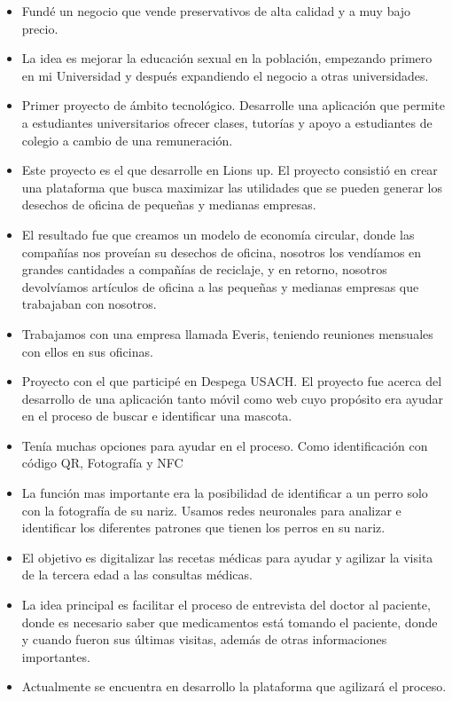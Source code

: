 \begin{itemize}
\item Fundé un negocio que vende preservativos de alta calidad y a muy bajo precio.
\item La idea es mejorar la educación sexual en la población, empezando primero en mi Universidad y después expandiendo el negocio a otras universidades.
\end{itemize}
\smallskip
{}
\begin{itemize}
\item Primer proyecto de ámbito tecnológico. Desarrolle una aplicación que permite a estudiantes universitarios ofrecer clases, tutorías y apoyo a estudiantes de colegio a cambio de una remuneración.
\end{itemize}
\smallskip
{}
\begin{itemize}
\item Este proyecto es el que desarrolle en Lions up. El proyecto consistió en crear una plataforma que busca maximizar las utilidades que se pueden generar los desechos de oficina de pequeñas y medianas empresas.
\item El resultado fue que creamos un modelo de economía circular, donde las compañías nos proveían su desechos de oficina, nosotros los vendíamos en grandes cantidades a compañías de reciclaje, y en retorno, nosotros devolvíamos artículos de oficina a las pequeñas y medianas empresas que trabajaban con nosotros.
\item Trabajamos con una empresa llamada Everis, teniendo reuniones mensuales con ellos en sus oficinas.
\end{itemize}
\smallskip
{}
\begin{itemize}
\item Proyecto con el que participé en Despega USACH. El proyecto fue acerca del desarrollo de una aplicación tanto móvil como web cuyo propósito era ayudar en el proceso de buscar e identificar una mascota.
\item Tenía muchas opciones para ayudar en el proceso. Como identificación con código QR, Fotografía y NFC
\item La función mas importante era la posibilidad de identificar a un perro solo con la fotografía de su nariz. Usamos redes neuronales para analizar e identificar los diferentes patrones que tienen los perros en su nariz.
\end{itemize}
\smallskip
{}
\begin{itemize}
\item El objetivo es digitalizar las recetas médicas para ayudar y agilizar la visita de la tercera edad a las consultas médicas.
\vspace{2cm}
\item La idea principal es facilitar el proceso de entrevista del doctor al paciente, donde es necesario saber que medicamentos está tomando el paciente, donde y cuando fueron sus últimas visitas, además de otras informaciones importantes.
\smallskip
\item Actualmente se encuentra en desarrollo la plataforma que agilizará el proceso.
\end{itemize}

